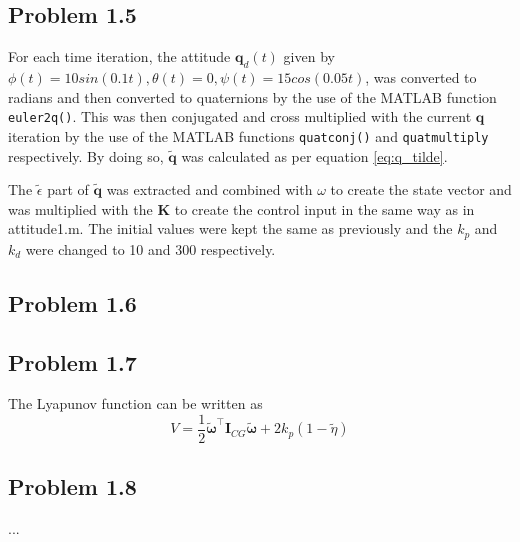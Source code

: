 

\subsection*{Problem 1.5}
For each time iteration, the attitude $\mathbf{q}_d(t)$ given by $\phi(t) = 10sin(0.1t), \theta(t) = 0, \psi(t) = 15cos(0.05t)$, was converted to radians and then converted to quaternions by the use of the MATLAB function \texttt{euler2q()}. This was then conjugated and cross multiplied with the current $\mathbf{q}$ iteration by the use of the MATLAB functions \texttt{quatconj()} and \texttt{quatmultiply} respectively. By doing so, $\mathbf{\tilde{q}}$ was calculated as per equation \eqref{eq:q_tilde}.

The $\tilde{\epsilon}$ part of $\mathbf{\tilde{q}}$ was extracted and combined with $\omega$ to create the state vector and was multiplied with the $\mathbf{K}$ to create the control input in the same way as in {\color{blue} attitude1.m}. The initial values were kept the same as previously and the $k_p$ and $k_d$ were changed to 10 and 300 respectively. 

\subsection*{Problem 1.6}



\subsection*{Problem 1.7}
The Lyapunov function can be written as 
 \begin{equation}
	 V = \frac{1}{2} \tilde{\boldsymbol{\omega}}^{\top} \mathbf{I}_{CG}\tilde{\boldsymbol{\omega}} + 2 k_p (1-\tilde{\eta})
 \end{equation}

\subsection*{Problem 1.8}
...


